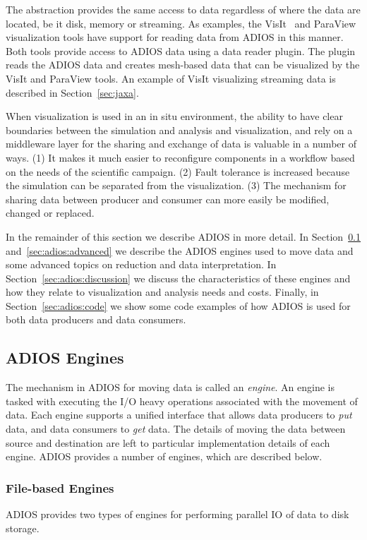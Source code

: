 The abstraction provides the same access to data regardless of where the data are located, be it disk, memory or streaming. 
As examples, the  VisIt~\cite{HPV:VisIt} and ParaView~\cite{paraview} visualization tools have support for reading data from ADIOS in this manner.
Both tools provide access to ADIOS data using a data reader plugin.
The plugin reads the ADIOS data and creates mesh-based data that can be visualized by the VisIt and ParaView tools.
An example of VisIt visualizing streaming data is described in Section~\ref{sec:jaxa}.

When visualization is used in an in situ environment, the ability to have clear boundaries between the simulation and analysis and visualization, and rely on a middleware layer for the sharing and exchange of data is valuable in a number of ways. 
(1) It makes it much easier to reconfigure components in a workflow based on the needs of the scientific campaign. (2) Fault tolerance is increased because the simulation can be separated from the visualization. (3) The mechanism for sharing data between producer and consumer can more easily be modified, changed or replaced.

In the remainder of this section we describe ADIOS in more detail. In Section~\ref{sec:adios:engine} and~\ref{sec:adios:advanced} we describe the ADIOS engines used to move data and some advanced topics on reduction and data interpretation.
In Section~\ref{sec:adios:discussion} we discuss the characteristics of these engines and how they relate to visualization and analysis needs and costs. Finally, in Section~\ref{sec:adios:code} we show some code examples of how ADIOS is used for both data producers and data consumers.

\subsection{ADIOS Engines}
\label{sec:adios:engine}

The mechanism in ADIOS for moving data is called an \emph{engine}.
An engine is tasked with executing the I/O heavy operations associated with the movement of data. 
Each engine supports a unified interface that allows data producers to \emph{put} data, and data consumers to \emph{get} data. The details of moving the data between source and destination are left to particular implementation details of each engine.
ADIOS provides a number of engines, which are described below.

\subsubsection{File-based Engines}
ADIOS provides two types of engines for performing parallel IO of data to disk storage. 

